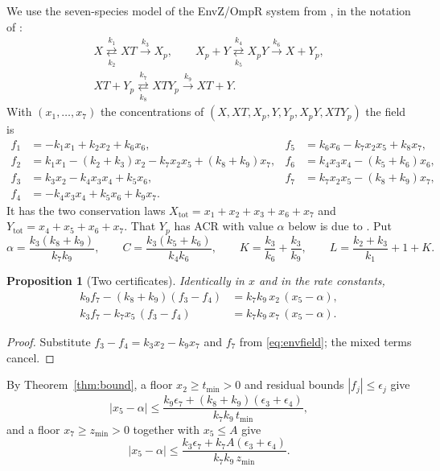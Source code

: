 \documentclass[11pt,a4paper]{article}
\theoremstyle{plain}
\newtheorem{proposition}[theorem]{Proposition}
\theoremstyle{definition}
\theoremstyle{remark}
\newcommand{\Xtot}{X_{\mathrm{tot}}}
\newcommand{\Ytot}{Y_{\mathrm{tot}}}
\begin{document}
We use the seven-species model of the EnvZ/OmpR system from \cite{shinarfeinberg}, in the notation of \cite[Example~3.15]{acr}:
\begin{equation}\label{eq:envznet}
\begin{gathered}
 X\underset{k_2}{\overset{k_1}{\rightleftarrows}}XT\xrightarrow{k_3}X_p,\qquad
 X_p+Y\underset{k_5}{\overset{k_4}{\rightleftarrows}}X_pY\xrightarrow{k_6}X+Y_p,\\
 XT+Y_p\underset{k_8}{\overset{k_7}{\rightleftarrows}}XTY_p\xrightarrow{k_9}XT+Y .
\end{gathered}
\end{equation}
With $(x_1,\dots,x_7)$ the concentrations of $(X,XT,X_p,Y,Y_p,X_pY,XTY_p)$ the field is
\begin{equation}\label{eq:envfield}
\begin{aligned}
 f_1&=-k_1x_1+k_2x_2+k_6x_6, & f_5&=k_6x_6-k_7x_2x_5+k_8x_7,\\
 f_2&=k_1x_1-(k_2+k_3)x_2-k_7x_2x_5+(k_8+k_9)x_7, & f_6&=k_4x_3x_4-(k_5+k_6)x_6,\\
 f_3&=k_3x_2-k_4x_3x_4+k_5x_6, & f_7&=k_7x_2x_5-(k_8+k_9)x_7,\\
 f_4&=-k_4x_3x_4+k_5x_6+k_9x_7 .
\end{aligned}
\end{equation}
It has the two conservation laws $\Xtot=x_1+x_2+x_3+x_6+x_7$ and $\Ytot=x_4+x_5+x_6+x_7$. That $Y_p$ has ACR with value $\alpha$ below is due to \cite{shinarfeinberg}. Put
\[
 \alpha=\frac{k_3(k_8+k_9)}{k_7k_9},\qquad C=\frac{k_3(k_5+k_6)}{k_4k_6},\qquad K=\frac{k_3}{k_6}+\frac{k_3}{k_9},\qquad L=\frac{k_2+k_3}{k_1}+1+K .
\]

\begin{proposition}[Two certificates]\label{prop:envcert}
Identically in $x$ and in the rate constants,
\begin{align}
  k_9f_7-(k_8+k_9)(f_3-f_4)&=k_7k_9\,x_2\,(x_5-\alpha),\label{eq:env1}\\
  k_3f_7-k_7x_5\,(f_3-f_4)&=k_7k_9\,x_7\,(x_5-\alpha).\label{eq:env2}
\end{align}
\end{proposition}
\begin{proof}
Substitute $f_3-f_4=k_3x_2-k_9x_7$ and $f_7$ from \eqref{eq:envfield}; the mixed terms cancel.
\end{proof}

By Theorem~\ref{thm:bound}, a floor $x_2\ge t_{\min}>0$ and residual bounds $|f_j|\le\epsilon_j$ give
\begin{equation}\label{eq:envgain1}
  |x_5-\alpha|\le\frac{k_9\epsilon_7+(k_8+k_9)(\epsilon_3+\epsilon_4)}{k_7k_9\,t_{\min}},
\end{equation}
and a floor $x_7\ge z_{\min}>0$ together with $x_5\le A$ give
\begin{equation}\label{eq:envgain2}
  |x_5-\alpha|\le\frac{k_3\epsilon_7+k_7A(\epsilon_3+\epsilon_4)}{k_7k_9\,z_{\min}}.
\end{equation}
\end{document}
